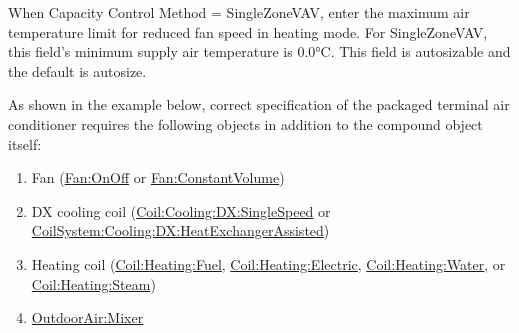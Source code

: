 When Capacity Control Method = SingleZoneVAV, enter the maximum air temperature limit for reduced fan speed in heating mode. For SingleZoneVAV, this field's minimum supply air temperature is 0.0\si{\degreeCelsius}. This field is autosizable and the default is autosize.


As shown in the example below, correct specification of the packaged terminal air conditioner requires the following objects in addition to the compound object itself:

\begin{enumerate}
\def\labelenumi{\arabic{enumi})}
\item
  Fan (\hyperref[fanonoff]{Fan:OnOff} or \hyperref[fanconstantvolume]{Fan:ConstantVolume})
\item
  DX cooling coil (\hyperref[coilcoolingdxsinglespeed]{Coil:Cooling:DX:SingleSpeed} or \hyperref[coilsystemcoolingdxheatexchangerassisted]{CoilSystem:Cooling:DX:HeatExchangerAssisted})
\item
  Heating coil (\hyperref[coilheatinggas-000]{Coil:Heating:Fuel}, \hyperref[coilheatingelectric]{Coil:Heating:Electric}, \hyperref[coilheatingwater]{Coil:Heating:Water}, or \hyperref[coilheatingsteam]{Coil:Heating:Steam})
\item
  \hyperref[outdoorairmixer]{OutdoorAir:Mixer}
\end{enumerate}

